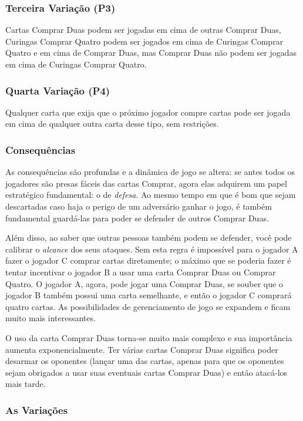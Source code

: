 \subsubsection{Terceira Variação (P3)} Cartas Comprar Duas podem ser jogadas em cima de outras Comprar Duas, Curingas Comprar Quatro podem ser jogados em cima de Curingas Comprar Quatro e em cima de Comprar Duas, mas Comprar Duas não podem ser jogadas em cima de Curingas Comprar Quatro.

\subsubsection{Quarta Variação (P4)} Qualquer carta que exija que o próximo jogador compre cartas pode ser jogada em cima de qualquer outra carta desse tipo, sem restrições.

\subsubsection{Consequências}

As consequências são profundas e a dinâmica de jogo se altera: se antes todos os jogadores são presas fáceis das cartas Comprar, agora elas adquirem um papel estratégico fundamental: o de \emph{defesa}. Ao mesmo tempo em que é bom que sejam descartadas caso haja o perigo de um adversário ganhar o jogo, é também fundamental guardá-las para poder se defender de outros Comprar Duas.

Além disso, ao saber que outras pessoas também podem se defender, você pode calibrar o \emph{alcance} dos seus ataques. Sem esta regra é impossível para o jogador A fazer o jogador C comprar cartas diretamente; o máximo que se poderia fazer é tentar incentivar o jogador B a usar uma carta Comprar Duas ou Comprar Quatro. O jogador A, agora, pode jogar uma Comprar Duas, se souber que o jogador B também possui uma carta semelhante, e então o jogador C comprará quatro cartas. As possibilidades de gerenciamento de jogo se expandem e ficam muito mais interessantes.

O uso da carta Comprar Duas torna-se muito mais complexo e sua importância aumenta exponencialmente. Ter várias cartas Comprar Duas significa poder desarmar os oponentes (lançar uma das cartas, apenas para que os oponentes sejam obrigados a usar suas eventuais cartas Comprar Duas) e então atacá-los mais tarde.

\subsubsection{As Variações}

